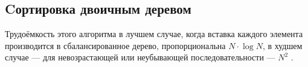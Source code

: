 \subsection{Cортировка двоичным деревом}
Трудоёмкость этого алгоритма в лучшем случае, когда вставка каждого элемента производится в сбалансированное дерево, пропорциональна $N \cdot \log{N}$, в худшем случае --- для невозрастающей или неубывающей последовательности --- $N^2$ \cite{knuth}.


